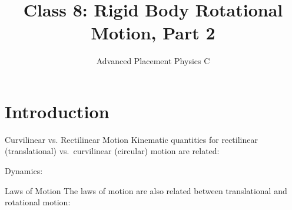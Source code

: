 \documentclass[12pt,compress,aspectratio=169]{beamer}
\title{Class 8: Rigid Body Rotational Motion, Part 2}
\subtitle{Advanced Placement Physics C}
\begin{document}
\begin{frame}
  \maketitle
\end{frame}



\section{Introduction}

\begin{frame}{Curvilinear vs. Rectilinear Motion}
  Kinematic quantities for rectilinear (translational) vs.\ curvilinear
  (circular) motion are related:

  \vspace{-.3in}{\large
    \begin{align*}
      \vec r &\quad\rightarrow\quad \theta \\
      \vec v &\quad\rightarrow\quad \omega \\
      \vec a &\quad\rightarrow\quad \alpha
    \end{align*}
  }

  Dynamics:
  
  \vspace{-.3in}{\large
    \begin{align*}
      m &\quad\rightarrow\quad I\\
      \vec F &\quad\rightarrow\quad \tau\\
      \vec p=m\vec v &\quad\rightarrow\quad L=I\omega
    \end{align*}
  }
\end{frame}



\begin{frame}{Laws of Motion}
  The laws of motion are also related between translational and rotational
  motion:
  
\end{frame}
\end{document}
